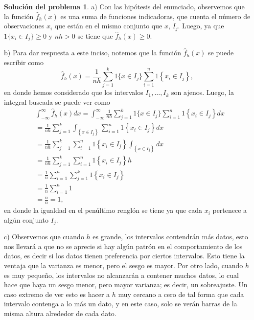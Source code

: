 \documentclass[twoside,12pt]{article}
\theoremstyle{definition}
\newtheorem{soln}{Solución del problema}
\begin{document}
\newpage
\begin{soln}
a) Con las hipótesis del enunciado, observemos que la función $\hat{f}_h(x)$ es una suma de funciones indicadoras, que cuenta el número de observaciones $x_i$ que están en el mismo conjunto que $x$, $I_j$. Luego, ya que $1\{x_i \in I_j\} \geq 0$ y $nh>0$ se tiene que $\hat{f}_h(x)\geq 0$.

b) Para dar respuesta a este inciso, notemos que la función $\hat{f}_h(x)$ se puede escribir como
\[ 
\hat{f}_h(x)=\frac{1}{n h} \sum_{j=1}^k 1\{x \in I_j\}\sum_{i=1}^n 1\left\{x_i \in I_j\right\},
\]
en donde hemos considerado que los intervalos $I_1, \ldots, I_k$ son ajenos. Luego, la integral buscada se puede ver como
\[
\begin{split}
  & \int_{-\infty}^{\infty} \hat{f}_h(x) d x= \int_{-\infty}^{\infty} \frac{1}{n h} \sum_{j=1}^k 1\{x \in I_j\}\sum_{i=1}^n 1\left\{x_i \in I_j\right\} d x \\
  &=  \frac{1}{n h} \sum_{j=1}^k \int_{\left\lbrace x\in I_j \right\rbrace} \sum_{i=1}^n 1\left\{x_i \in I_j\right\} dx\\
  &=  \frac{1}{n h} \sum_{j=1}^k \sum_{i=1}^n 1\left\{x_i \in I_j\right\} \int_{\left\lbrace x\in I_j \right\rbrace}  dx\\
  &=  \frac{1}{n h} \sum_{j=1}^k \sum_{i=1}^n 1\left\{x_i \in I_j\right\} h\\
  &=  \frac{1}{n} \sum_{i=1}^n \sum_{j=1}^k 1\left\{x_i \in I_j\right\}\\ 
  &=  \frac{1}{n} \sum_{i=1}^n 1\\ 
  &=  \frac{n}{n}=1,
\end{split}
\]
en donde la igualdad en el penúltimo renglón se tiene ya que cada $x_i$ pertenece a algún conjunto $I_j$.

c) Observemos que cuando $h$ es grande, los intervalos contendrán más datos, esto nos llevará a que no se aprecie si hay algún patrón en el comportamiento de los datos, es decir si los datos tienen preferencia por ciertos intervalos. Esto tiene la ventaja que la varianza es menor, pero el sesgo es mayor. Por otro lado, cuando $h$ es muy pequeño, los intervalos no alcanzarán a contener muchos datos, lo cual hace que haya un sesgo menor, pero mayor varianza; es decir, un sobreajuste. Un caso extremo de ver esto es hacer a $h$ muy cercano a cero de tal forma que cada intervalo contenga a lo más un dato, y en este caso, solo se verán barras de la misma altura alrededor de cada dato.

\end{soln}
\end{document}

